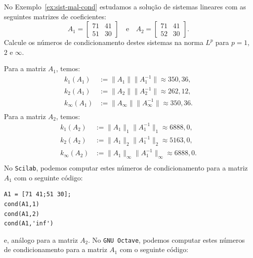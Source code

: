 \begin{ex}
  No Exemplo~\ref{ex:sist-mal-cond} estudamos a solução de sistemas lineares com as seguintes matrizes de coeficientes:
  \begin{equation*}
    A_1 =
    \begin{bmatrix}
      71 & 41\\
      51 & 30
    \end{bmatrix}\quad\text{e}\quad
    A_2 =
    \begin{bmatrix}
      71 & 41\\
      52 & 30
    \end{bmatrix}.
  \end{equation*}
Calcule os números de condicionamento destes sistemas na norma $L^p$ para $p=1$, $2$ e $\infty$.
\end{ex}
\begin{sol}
  Para a matriz $A_1$, temos:
  \begin{equation*}
    \begin{split}
      k_1(A_1) &:= \|A_1\|\|A_1^{-1}\| \approx 350,36,\\
      k_2(A_1) &:= \|A_2\|\|A_2^{-1}\| \approx 262,12,\\
      k_\infty(A_1) &:= \|A_\infty\|\|A_\infty^{-1}\| \approx 350,36.\\
    \end{split}
  \end{equation*}
  Para a matriz $A_2$, temos:
  \begin{equation*}
    \begin{split}
      k_1(A_2) &:= \|A_1\|_1\|A_1^{-1}\|_1 \approx 6888,0,\\
      k_2(A_2) &:= \|A_1\|_2\|A_1^{-1}\|_2 \approx 5163,0,\\
      k_\infty(A_2) &:= \|A_1\|_\infty\|A_1^{-1}\|_\infty \approx 6888,0.\\
    \end{split}
  \end{equation*}
\ifisscilab
No \verb+Scilab+, podemos computar estes números de condicionamento para a matriz $A_1$ com o seguinte código:
\begin{verbatim}
A1 = [71 41;51 30];
cond(A1,1)
cond(A1,2)
cond(A1,'inf')
\end{verbatim}
e, análogo para a matriz $A_2$.
\fi
\ifisoctave
No \verb+GNU Octave+, podemos computar estes números de condicionamento para a matriz $A_1$ com o seguinte código:

\end{sol}
